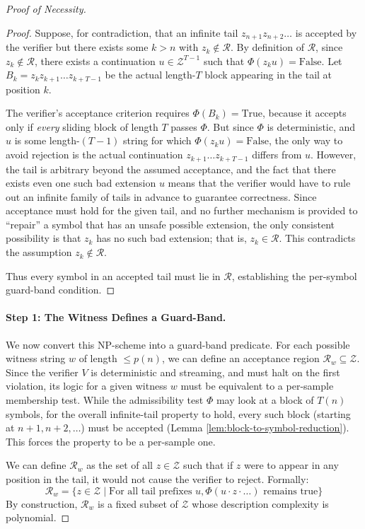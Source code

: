 \documentclass[12pt]{article}
\theoremstyle{definition}
\theoremstyle{plain}
\begin{document}
\begin{proof}[Proof of Necessity]
\begin{proof}
Suppose, for contradiction, that an infinite tail $z_{n+1}z_{n+2}\dots$ is accepted by the verifier but there exists some $k>n$ with $z_k\notin\mathcal{R}$. By definition of $\mathcal{R}$, since $z_k\notin\mathcal{R}$, there exists a continuation $u\in\mathcal{Z}^{T-1}$ such that $\Phi(z_k u)=\mathrm{False}$. Let $B_k = z_k z_{k+1} \dots z_{k+T-1}$ be the actual length-$T$ block appearing in the tail at position $k$.

The verifier’s acceptance criterion requires $\Phi(B_k)=\mathrm{True}$, because it accepts only if \emph{every} sliding block of length $T$ passes $\Phi$. But since $\Phi$ is deterministic, and $u$ is some length-$(T-1)$ string for which $\Phi(z_k u)=\mathrm{False}$, the only way to avoid rejection is the actual continuation $z_{k+1}\dots z_{k+T-1}$ differs from $u$. However, the tail is arbitrary beyond the assumed acceptance, and the fact that there exists even one such bad extension $u$ means that the verifier would have to rule out an infinite family of tails in advance to guarantee correctness. Since acceptance must hold for the given tail, and no further mechanism is provided to “repair” a symbol that has an unsafe possible extension, the only consistent possibility is that $z_k$ has no such bad extension; that is, $z_k\in\mathcal{R}$. This contradicts the assumption $z_k\notin\mathcal{R}$.

Thus every symbol in an accepted tail must lie in $\mathcal{R}$, establishing the per-symbol guard-band condition.
\end{proof}


\paragraph{Step 1: The Witness Defines a Guard-Band.}
We now convert this NP-scheme into a guard-band predicate. For each possible witness string $w$ of length $\le p(n)$, we can define an acceptance region $\mathcal{R}_w \subseteq \mathcal{Z}$. Since the verifier $V$ is deterministic and streaming, and must halt on the first violation, its logic for a given witness $w$ must be equivalent to a per-sample membership test. While the admissibility test $\Phi$ may look at a block of $T(n)$ symbols, for the overall infinite-tail property to hold, every such block (starting at $n+1, n+2, \dots$) must be accepted (Lemma \ref{lem:block-to-symbol-reduction}). This forces the property to be a per-sample one.

We can define $\mathcal{R}_w$ as the set of all $z \in \mathcal{Z}$ such that if $z$ were to appear in any position in the tail, it would not cause the verifier to reject. Formally:
\[
\mathcal{R}_w = \{ z \in \mathcal{Z} \mid \text{For all tail prefixes } u, \Phi(u \cdot z \cdot \dots) \text{ remains true} \}
\]
By construction, $\mathcal{R}_w$ is a fixed subset of $\mathcal{Z}$ whose description complexity is polynomial.


\end{proof}
\end{document}
